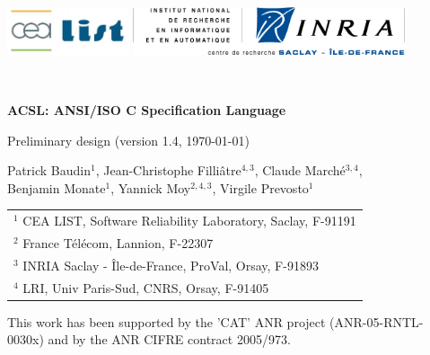 \documentclass[a4paper,11pt,twoside,openright]{report}
\newcommand{\version}{1.4}
\begin{document}
\sloppy
{}

\begin{titlepage}
\begin{center}
\includegraphics[height=14mm]{cealistlogo.jpg}
\hfill
\includegraphics[height=14mm]{inriasaclaylogo.png}

\vfill

~

\vspace{20mm}

{\Huge\bfseries ACSL: ANSI/ISO C Specification Language}

\bigskip

{\LARGE Preliminary design (version \version, \today)}

\vspace{20mm}

{Patrick Baudin$^1$, Jean-Christophe Filli\^atre$^{4,3}$, Claude March\'e$^{3,4}$,\\ Benjamin Monate$^1$, Yannick Moy$^{2,4,3}$, Virgile Prevosto$^1$}

\medskip

\begin{tabular}{l}
$^1$ CEA LIST, Software Reliability Laboratory, Saclay, F-91191 \\
$^2$ France T\'el\'ecom, Lannion, F-22307 \\
$^3$ INRIA Saclay - \^Ile-de-France, ProVal, Orsay, F-91893 \\
$^4$ LRI, Univ Paris-Sud, CNRS, Orsay, F-91405
\end{tabular}

\vfill


\begin{flushleft}
  This work has been supported by the 'CAT' ANR project
  (ANR-05-RNTL-0030x) and by the ANR CIFRE contract 2005/973.
\end{flushleft}

\end{center}
\end{titlepage}

\clearpage
\label{chap:contents}
\tableofcontents
\end{document}
